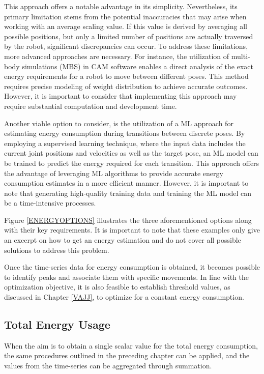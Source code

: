 \documentclass[conference]{IEEEtran}
\begin{document}
This approach offers a notable advantage in its simplicity. Nevertheless, its primary limitation stems from the potential inaccuracies that may arise when working with an average scaling value. If this value is derived by averaging all possible positions, but only a limited number of positions are actually traversed by the robot, significant discrepancies can occur. To address these limitations, more advanced approaches are necessary. For instance, the utilization of multi-body simulations (MBS) in CAM software enables a direct analysis of the exact energy requirements for a robot to move between different poses. This method requires precise modeling of weight distribution to achieve accurate outcomes. However, it is important to consider that implementing this approach may require substantial computation and development time.


Another viable option to consider, is the utilization of a ML approach for estimating energy consumption during transitions between discrete poses. By employing a supervised learning technique, where the input data includes the current joint positions and velocities as well as the target pose, an ML model can be trained to predict the energy required for each transition. This approach offers the advantage of leveraging ML algorithms to provide accurate energy consumption estimates in a more efficient manner. However, it is important to note that generating high-quality training data and training the ML model can be a time-intensive processes.

Figure \ref{ENERGYOPTIONS} illustrates the three aforementioned options along with their key requirements. It is important to note that these examples only give an excerpt on how to get an energy estimation and do not cover all possible solutions to address this problem. 



Once the time-series data for energy consumption is obtained, it becomes possible to identify peaks and associate them with specific movements. In line with the optimization objective, it is also feasible to establish threshold values, as discussed in Chapter \ref{VAJJ}, to optimize for a constant energy consumption.


\subsection{Total Energy Usage}
When the aim is to obtain a single scalar value for the total energy consumption, the same procedures outlined in the preceding chapter can be applied, and the values from the time-series can be aggregated through summation.
\end{document}
